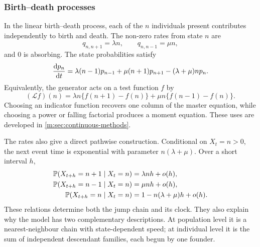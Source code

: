 \subsubsection{Birth--death processes}\label{m:sec:birth-death}

In the linear birth--death process, each of the $n$ individuals present contributes
independently to birth and death.  The non-zero rates from state $n$ are
\begin{equation}
  q_{n,n+1}=\lambda n,\qquad q_{n,n-1}=\mu n,
  \label{m:eq:bdrates}
\end{equation}
and $0$ is absorbing.  The state probabilities satisfy
\begin{equation}
  \frac{\mathrm{d} p_n}{\mathrm{d} t}=\lambda(n-1)p_{n-1}+\mu(n+1)p_{n+1}
  -(\lambda+\mu)n p_n.
  \label{m:eq:bdmaster}
\end{equation}
Equivalently, the generator acts on a test function $f$ by
\begin{equation}
  (\mathcal Lf)(n)
  =\lambda n\{f(n+1)-f(n)\}
   +\mu n\{f(n-1)-f(n)\}.
  \label{m:eq:bd-generator-action}
\end{equation}
Choosing an indicator function recovers one column of the master equation, while
choosing a power or falling factorial produces a moment equation.  These uses are
developed in \cref{m:sec:continuous-methods}.

The rates also give a direct pathwise construction.  Conditional on $X_t=n>0$,
the next event time is exponential with parameter $n(\lambda+\mu)$.  Over a short
interval $h$,
\begin{align}
  \mathbb{P}\!\left(X_{t+h}=n+1\mid X_t=n\right)&=\lambda n h+o(h),\notag\\
  \mathbb{P}\!\left(X_{t+h}=n-1\mid X_t=n\right)&=\mu n h+o(h),\notag\\
  \mathbb{P}\!\left(X_{t+h}=n\mid X_t=n\right)&=1-n(\lambda+\mu)h+o(h).
  \label{m:eq:bd-infinitesimal-transitions}
\end{align}
These relations determine both the jump chain and its clock.  They also explain
why the model has two complementary descriptions.  At population level it is a
nearest-neighbour chain with state-dependent speed; at individual level it is the
sum of independent descendant families, each begun by one founder.

